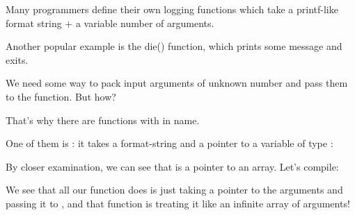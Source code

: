 
Many programmers define their own logging functions which take a printf-like format string + 
a variable number of arguments.

Another popular example is the die() function, which prints some message and exits.

We need some way to pack input arguments of unknown number and pass them to the \printf function.
But how?

That's why there are functions with  in name.

One of them is : it takes a format-string and a pointer to a variable of type :



By closer examination, we can see that  is a pointer to an array.
Let's compile:



We see that all our function does is just taking a pointer to the arguments and
passing it to , and that function is treating it like an infinite array of arguments!


